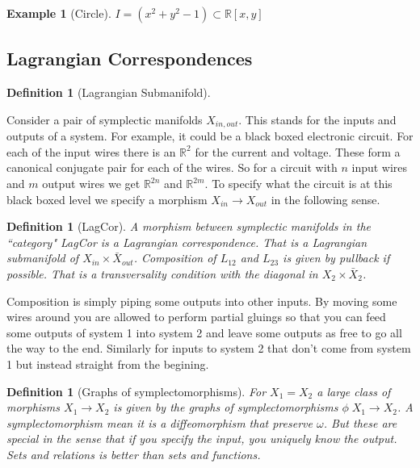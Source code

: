 \documentclass[a4paper,landscape]{article}
\theoremstyle{change}
\newtheorem{definition}[equation]{Definition}
\newtheorem{example}[equation]{Example}
\theoremstyle{nonumberplain}
\numberwithin{equation}{section}
\begin{document}
\begin{example}[Circle]
$I = (x^2 + y^2 - 1) \subset \mathbb{R}[x,y]$
\end{example}

\subsection{Lagrangian Correspondences}

\begin{definition}[Lagrangian Submanifold]
\end{definition}

Consider a pair of symplectic manifolds $X_{in,out}$. This stands for the inputs and outputs of a system. For example, it could be a black boxed electronic circuit. For each of the input wires there is an $\mathbb{R}^2$ for the current and voltage. These form a canonical conjugate pair for each of the wires. So for a circuit with $n$ input wires and $m$ output wires we get $\mathbb{R}^{2n}$ and $\mathbb{R}^{2m}$. To specify what the circuit is at this black boxed level we specify a morphism $X_{in} \to X_{out}$ in the following sense.

\begin{definition}[LagCor]
A morphism between symplectic manifolds in the ``category" LagCor is a Lagrangian correspondence. That is a Lagrangian submanifold of $X_{in} \times \bar{X}_{out}$. Composition of $L_{12}$ and $L_{23}$ is given by pullback if possible. That is a transversality condition with the diagonal in $X_2 \times \bar{X}_2$.


\end{definition}

Composition is simply piping some outputs into other inputs. By moving some wires around you are allowed to perform partial gluings so that you can feed some outputs of system 1 into system 2 and leave some outputs as free to go all the way to the end. Similarly for inputs to system 2 that don't come from system 1 but instead straight from the begining.

\begin{definition}[Graphs of symplectomorphisms]
For $X_1 = X_2$ a large class of morphisms $X_1 \to X_2$ is given by the graphs of symplectomorphisms $\phi \; X_1 \to X_2$. A symplectomorphism mean it is a diffeomorphism that preserve $\omega$. But these are special in the sense that if you specify the input, you uniquely know the output. Sets and relations is better than sets and functions.
\end{definition}
\end{document}
